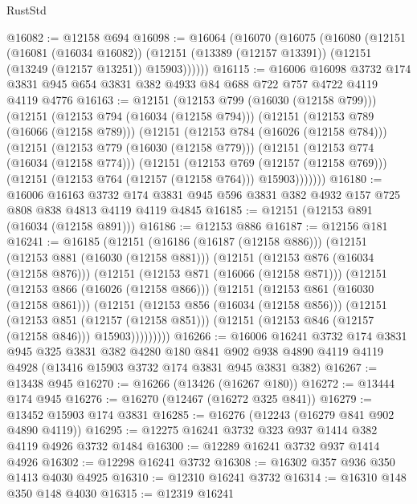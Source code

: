 \begin{lexlean}{RustStd}
\begin{coremodule}
@16082 := @12158 @694
@16098 := @16064
    (@16070
      (@16075
        (@16080
          (@12151
            (@16081 (@16034 @16082))
            (@12151 (@13389 (@12157 @13391)) (@12151 (@13249 (@12157 @13251)) @15903))))))
@16115 := @16006
    @16098
    @3732
    @174
    @3831
    @945
    @654
    @3831
    @382
    @4933
    @84
    @688
    @722
    @757
    @4722
    @4119
    @4119
    @4776
@16163 := @12151
    (@12153 @799 (@16030 (@12158 @799)))
    (@12151
      (@12153 @794 (@16034 (@12158 @794)))
      (@12151
        (@12153 @789 (@16066 (@12158 @789)))
        (@12151
          (@12153 @784 (@16026 (@12158 @784)))
          (@12151
            (@12153 @779 (@16030 (@12158 @779)))
            (@12151
              (@12153 @774 (@16034 (@12158 @774)))
              (@12151
                (@12153 @769 (@12157 (@12158 @769)))
                (@12151 (@12153 @764 (@12157 (@12158 @764))) @15903)))))))
@16180 := @16006
    @16163
    @3732
    @174
    @3831
    @945
    @596
    @3831
    @382
    @4932
    @157
    @725
    @808
    @838
    @4813
    @4119
    @4119
    @4845
@16185 := @12151 (@12153 @891 (@16034 (@12158 @891)))
@16186 := @12153 @886
@16187 := @12156 @181
@16241 := @16185
    (@12151
      (@16186 (@16187 (@12158 @886)))
      (@12151
        (@12153 @881 (@16030 (@12158 @881)))
        (@12151
          (@12153 @876 (@16034 (@12158 @876)))
          (@12151
            (@12153 @871 (@16066 (@12158 @871)))
            (@12151
              (@12153 @866 (@16026 (@12158 @866)))
              (@12151
                (@12153 @861 (@16030 (@12158 @861)))
                (@12151
                  (@12153 @856 (@16034 (@12158 @856)))
                  (@12151
                    (@12153 @851 (@12157 (@12158 @851)))
                    (@12151 (@12153 @846 (@12157 (@12158 @846))) @15903)))))))))
@16266 := @16006
    @16241
    @3732
    @174
    @3831
    @945
    @325
    @3831
    @382
    @4280
    @180
    @841
    @902
    @938
    @4890
    @4119
    @4119
    @4928
    (@13416 @15903 @3732 @174 @3831 @945 @3831 @382)
@16267 := @13438 @945
@16270 := @16266 (@13426 (@16267 @180))
@16272 := @13444 @174 @945
@16276 := @16270 (@12467 (@16272 @325 @841))
@16279 := @13452 @15903 @174 @3831
@16285 := @16276 (@12243 (@16279 @841 @902 @4890 @4119))
@16295 := @12275 @16241 @3732 @323 @937 @1414 @382 @4119 @4926 @3732 @1484
@16300 := @12289 @16241 @3732 @937 @1414 @4926
@16302 := @12298 @16241 @3732
@16308 := @16302 @357 @936 @350 @1413 @4030 @4925
@16310 := @12310 @16241 @3732
@16314 := @16310 @148 @350 @148 @4030
@16315 := @12319 @16241

\end{coremodule}
\end{lexlean}
